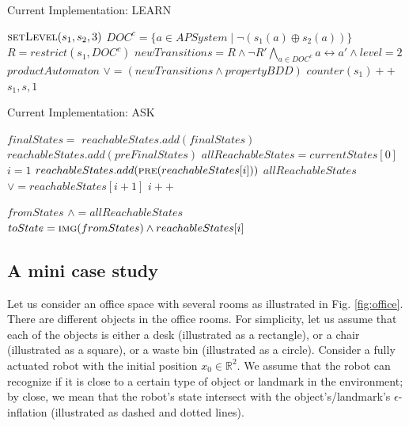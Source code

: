\documentclass{article}
\begin{document}
\begin{algorithm}
	\caption{Current Implementation: LEARN}\label{alg:current_learn}
	\begin{algorithmic}[1]
		\State $\Call{setLevel}{s_1,s_2,3}$
		\State $DOC^c=\{a\in APSystem\mid \neg(s_1(a)\oplus s_2(a))\}$
		\State $R=restrict(s_1,DOC^c)$
		\State $newTransitions=R \wedge \neg R' \bigwedge\limits_{a\in DOC^c} a\leftrightarrow a' \wedge level=2$
		\State $productAutomaton $ $\vee= (newTransitions \wedge propertyBDD)$
		\EndIf
		\State $counter(s_1)++$
		\State {} {$s_1,s,1$}
		\EndFor
		\EndIf
		\EndProcedure
	\end{algorithmic}
\end{algorithm}


\begin{algorithm}
	\caption{Current Implementation: ASK}\label{alg:current_ask}
	\begin{algorithmic}[1]
		\State $finalStates=$
		\State $reachableStates.add(finalStates)$ 
		\State $reachableStates.add(preFinalStates)$
		\State $allReachableStates=currentStates[0]$
		\State $i=1$
			\State $reachableStates.add(\Call{pre}{reachableStates[i]})$
			\State{}
			\State $allReachableStates$ $\vee =reachableStates[i+1]$
			\State $i++$
			
		\EndWhile
		\State $fromStates$ $\wedge=allReachableStates$
		\State$toState=\Call{img}{fromStates}\wedge reachableStates[i]$
		\State {}
		\EndProcedure
	\end{algorithmic}
\end{algorithm}

\subsection{A mini case study}

Let us consider an office space with several rooms as illustrated in Fig. \ref{fig:office}. There are different objects in the office rooms. For simplicity, let us assume that each of the objects is either a desk (illustrated as a rectangle), or a chair (illustrated as a square), or a waste bin (illustrated as a circle). Consider a fully actuated robot with the initial position $x_0 \in \mathbb{R}^2$. We assume that the robot can recognize if it is close to a certain type of object or landmark in the environment; by close, we mean that the robot's state intersect with the object's/landmark's $\epsilon$-inflation (illustrated as dashed and dotted lines).
\end{document}
